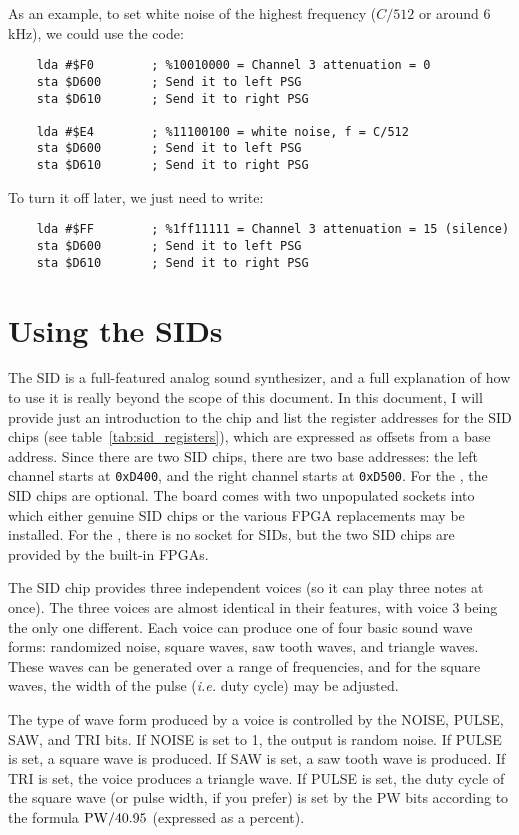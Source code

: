 As an example, to set white noise of the highest frequency ($C / 512$ or around 6 kHz), we could use the code:

\begin{verbatim}
    lda #$F0        ; %10010000 = Channel 3 attenuation = 0
    sta $D600       ; Send it to left PSG
    sta $D610       ; Send it to right PSG

    lda #$E4        ; %11100100 = white noise, f = C/512
    sta $D600       ; Send it to left PSG
    sta $D610       ; Send it to right PSG
\end{verbatim}
To turn it off later, we just need to write:

\begin{verbatim}
    lda #$FF        ; %1ff11111 = Channel 3 attenuation = 15 (silence)
    sta $D600       ; Send it to left PSG
    sta $D610       ; Send it to right PSG
\end{verbatim}

\section*{Using the SIDs}

The SID is a full-featured analog sound synthesizer, and a full explanation of how to use it is really beyond the scope of this document. In this document, I will provide just an introduction to the chip and list the register addresses for the SID chips (see table~\ref{tab:sid_registers}), which are expressed as offsets from a base address. Since there are two SID chips, there are two base addresses: the left channel starts at \verb+0xD400+, and the right channel starts at \verb+0xD500+. For the \fjr, the SID chips are optional. The board comes with two unpopulated sockets into which either genuine SID chips or the various FPGA replacements may be installed. For the \fk, there is no socket for SIDs, but the two SID chips are provided by the built-in FPGAs.

The SID chip provides three independent voices (so it can play three notes at once). The three voices are almost identical in their features, with voice 3 being the only one different. Each voice can produce one of four basic sound wave forms: randomized noise, square waves, saw tooth waves, and triangle waves. These waves can be generated over a range of frequencies, and for the square waves, the width of the pulse ({\it i.e.} duty cycle) may be adjusted.

The type of wave form produced by a voice is controlled by the NOISE, PULSE, SAW, and TRI bits. If NOISE is set to 1, the output is random noise. If PULSE is set, a square wave is produced. If SAW is set, a saw tooth wave is produced. If TRI is set, the voice produces a triangle wave. If PULSE is set, the duty cycle of the square wave (or pulse width, if you prefer) is set by the PW bits according to the formula
${\rm PW} / 40.95$ (expressed as a percent).


